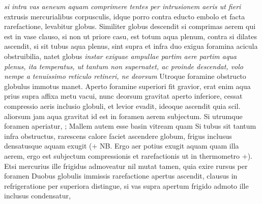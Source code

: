 \textit{si intra vas aeneum aquam comprimere tentes per intrusionem aeris ut fieri } extrusis mercurialibus corpusculis, idque  porro contra educto embolo et facta rarefactione, levabitur globus. 
\pend 
\pstart Similiter globus descendit si comprimas aerem qui est in vase clauso, si non ut priore casu, est totum aqua plenum, contra si dilates ascendit, si sit tubus aqua plenus, sint supra et infra duo exigua foramina acicula obstruibilia, natet globus \textit{instar exiguae ampullae partim aere partim aqua plenus, ita temperatus, ut tantum non supernatet, ac proinde descendat, volo nempe a tenuissimo reticulo retineri, ne deorsum } Utroque foramine obstructo globulus immotus manet. Aperto foramine superiori fit gravior, erat enim aqua prius supra affixa metu vacui, nunc deorsum gravitat aperto inferiore, cessat compressio aeris inclusio globuli, et levior evadit, ideoque ascendit quia scil. aliorsum jam aqua gravitat id est in foramen aerem subjectum. Si utrumque foramen aperiatur, ; Mallem autem esse basin vitream quam 
Si tubus sit tantum infra obstructus, rarescens calore faciet ascendere globum, frigus
 inclusus densatusque aquam exugit (+ NB. Ergo aer potius exugit aquam quam illa aerem, ergo est subjectum compressionis et rarefactionis ut in thermometro +). Etsi mercurius ille frigidus admoveatur nil mutat tamen, quia exire rursus per foramen
 Duobus globulis  immissis rarefactione apertus ascendit, clausus  in refrigeratione per superiora distingue, si vas supra apertum frigido admoto ille  inclusus condensatur,
